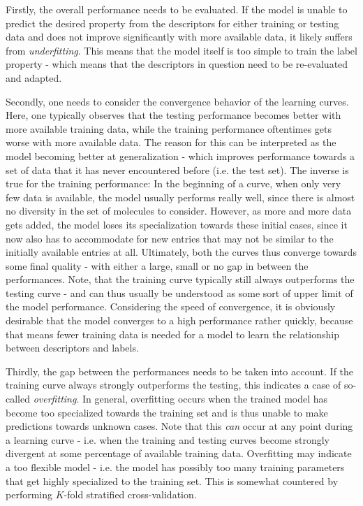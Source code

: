 \documentclass[12pt]{achemso}
\begin{document}
\noindent Firstly, the overall performance needs to be evaluated. If the model is unable to predict the desired property from the descriptors for either training or testing data and does not improve significantly with more available data, it likely suffers from \textit{underfitting}. This means that the model itself is too simple to train the label property - which means that the descriptors in question need to be re-evaluated and adapted.

\noindent Secondly, one needs to consider the convergence behavior of the learning curves. Here, one typically observes that the testing performance becomes better with more available training data, while the training performance oftentimes gets worse with more available data. The reason for this can be interpreted as the model becoming better at generalization - which improves performance towards a set of data that it has never encountered before (i.e. the test set). The inverse is true for the training performance: In the beginning of a curve, when only very few data is available, the model usually performs really well, since there is almost no diversity in the set of molecules to consider. However, as more and more data gets added, the model loses its specialization towards these initial cases, since it now also has to accommodate for new entries that may not be similar to the initially available entries at all. Ultimately, both the curves thus converge towards some final quality - with either a large, small or no gap in between the performances. Note, that the training curve typically still always outperforms the testing curve - and can thus usually be understood as some sort of upper limit of the model performance. Considering the speed of convergence, it is obviously desirable that the model converges to a high performance rather quickly, because that means fewer training data is needed for a model to learn the relationship between descriptors and labels.

\noindent Thirdly, the gap between the performances needs to be taken into account. If the training curve always strongly outperforms the testing, this indicates a case of so-called \textit{overfitting}. In general, overfitting occurs when the trained model has become too specialized towards the training set and is thus unable to make predictions towards unknown cases. Note that this \textit{can} occur at any point during a learning curve - i.e. when the training and testing curves become strongly divergent at some percentage of available training data. Overfitting may indicate a too flexible model - i.e. the model has possibly too many training parameters that get highly specialized to the training set. This is somewhat countered by performing $K$-fold stratified cross-validation.
\end{document}
